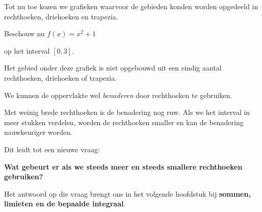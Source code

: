 \documentclass{ximera}
\begin{document}


Tot nu toe kozen we grafieken waarvoor de gebieden konden worden
opgedeeld in rechthoeken, driehoeken en trapezia.

Beschouw nu \(
f(x)=x^2+1\)

op het interval \([0,3]\).

\begin{center}
\end{center}

Het gebied onder deze grafiek is niet opgebouwd uit een eindig aantal
rechthoeken, driehoeken of trapezia.

We kunnen de oppervlakte wel \emph{benaderen} door rechthoeken te
gebruiken.

Met weinig brede rechthoeken is de benadering nog ruw. Als we het
interval in meer stukken verdelen, worden de rechthoeken smaller en
kan de benadering nauwkeuriger worden.

Dit leidt tot een nieuwe vraag:

\begin{center}
\textbf{Wat gebeurt er als we steeds meer en steeds smallere
rechthoeken gebruiken?}
\end{center}

Het antwoord op die vraag brengt ons in het volgende hoofdstuk bij
\textbf{sommen, limieten en de bepaalde integraal}.
\end{document}
